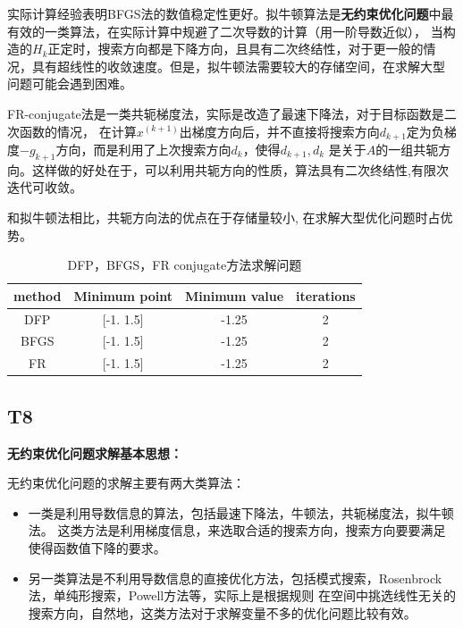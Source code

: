 \documentclass[a4paper]{article}
\begin{document}
        实际计算经验表明BFGS法的数值稳定性更好。拟牛顿算法是\textbf{无约束优化问题}中最有效的一类算法，在实际计算中规避了二次导数的计算（用一阶导数近似），
        当构造的$H_k$正定时，搜索方向都是下降方向，且具有二次终结性，对于更一般的情况，具有超线性的收敛速度。但是，拟牛顿法需要较大的存储空间，在求解大型
        问题可能会遇到困难。

        FR-conjugate法是一类共轭梯度法，实际是改造了最速下降法，对于目标函数是二次函数的情况，
        在计算$x^{(k+1)}$出梯度方向后，并不直接将搜索方向$d_{k+1}$定为负梯度$-g_{k+1}$方向，而是利用了上次搜索方向$d_{k}$，使得$d_{k+1}, d_{k}$
        是关于$A$的一组共轭方向。这样做的好处在于，可以利用共轭方向的性质，算法具有二次终结性,有限次迭代可收敛。

        和拟牛顿法相比，共轭方向法的优点在于存储量较小, 在求解大型优化问题时占优势。 

        \begin{table}[h!]
            \centering
            \begin{tabular}{cccc}
                \toprule
                method  &  Minimum point & Minimum value & iterations  \\
                \midrule
                DFP & [-1.   1.5] & -1.25 & 2 \\
                BFGS & [-1.   1.5] & -1.25 & 2\\
                FR & [-1.   1.5] & -1.25 & 2 \\
                \bottomrule
            \end{tabular}
            \caption{DFP，BFGS，FR conjugate方法求解问题}
            \end{table}
    \subsection*{T8}
    \textbf{无约束优化问题求解基本思想：}

    无约束优化问题的求解主要有两大类算法：
    \begin{itemize}
        \item  一类是利用导数信息的算法，包括最速下降法，牛顿法，共轭梯度法，拟牛顿法。
    这类方法是利用梯度信息，来选取合适的搜索方向，搜索方向要要满足使得函数值下降的要求。
        \item  另一类算法是不利用导数信息的直接优化方法，包括模式搜索，Rosenbrock法，单纯形搜索，Powell方法等，实际上是根据规则
    在空间中挑选线性无关的搜索方向，自然地，这类方法对于求解变量不多的优化问题比较有效。
    \end{itemize}
    
\end{document}
